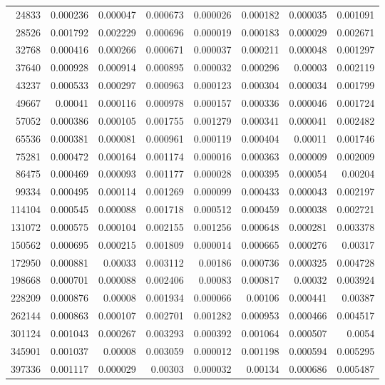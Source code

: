 \begin{longtable}{r r r r r r r r}
24833 & 0.000236 & 0.000047 & 0.000673 & 0.000026 & 0.000182 & 0.000035 & 0.001091 \\
28526 & 0.001792 & 0.002229 & 0.000696 & 0.000019 & 0.000183 & 0.000029 & 0.002671 \\
32768 & 0.000416 & 0.000266 & 0.000671 & 0.000037 & 0.000211 & 0.000048 & 0.001297 \\
37640 & 0.000928 & 0.000914 & 0.000895 & 0.000032 & 0.000296 & 0.00003 & 0.002119 \\
43237 & 0.000533 & 0.000297 & 0.000963 & 0.000123 & 0.000304 & 0.000034 & 0.001799 \\
49667 & 0.00041 & 0.000116 & 0.000978 & 0.000157 & 0.000336 & 0.000046 & 0.001724 \\
57052 & 0.000386 & 0.000105 & 0.001755 & 0.001279 & 0.000341 & 0.000041 & 0.002482 \\
65536 & 0.000381 & 0.000081 & 0.000961 & 0.000119 & 0.000404 & 0.00011 & 0.001746 \\
75281 & 0.000472 & 0.000164 & 0.001174 & 0.000016 & 0.000363 & 0.000009 & 0.002009 \\
86475 & 0.000469 & 0.000093 & 0.001177 & 0.000028 & 0.000395 & 0.000054 & 0.00204 \\
99334 & 0.000495 & 0.000114 & 0.001269 & 0.000099 & 0.000433 & 0.000043 & 0.002197 \\
114104 & 0.000545 & 0.000088 & 0.001718 & 0.000512 & 0.000459 & 0.000038 & 0.002721 \\
131072 & 0.000575 & 0.000104 & 0.002155 & 0.001256 & 0.000648 & 0.000281 & 0.003378 \\
150562 & 0.000695 & 0.000215 & 0.001809 & 0.000014 & 0.000665 & 0.000276 & 0.00317 \\
172950 & 0.000881 & 0.00033 & 0.003112 & 0.00186 & 0.000736 & 0.000325 & 0.004728 \\
198668 & 0.000701 & 0.000088 & 0.002406 & 0.00083 & 0.000817 & 0.00032 & 0.003924 \\
228209 & 0.000876 & 0.00008 & 0.001934 & 0.000066 & 0.00106 & 0.000441 & 0.00387 \\
262144 & 0.000863 & 0.000107 & 0.002701 & 0.001282 & 0.000953 & 0.000466 & 0.004517 \\
301124 & 0.001043 & 0.000267 & 0.003293 & 0.000392 & 0.001064 & 0.000507 & 0.0054 \\
345901 & 0.001037 & 0.00008 & 0.003059 & 0.000012 & 0.001198 & 0.000594 & 0.005295 \\
397336 & 0.001117 & 0.000029 & 0.00303 & 0.000032 & 0.00134 & 0.000686 & 0.005487 \\

\end{longtable}
